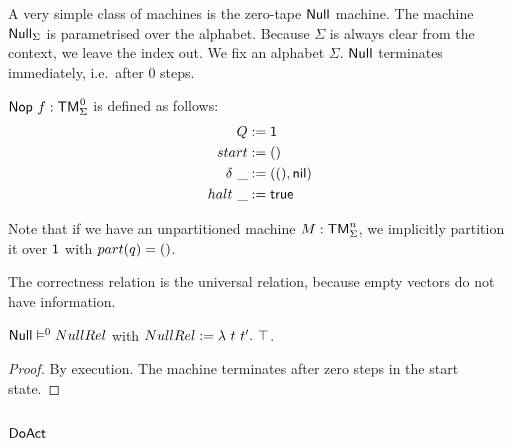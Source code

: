 A very simple class of machines is the zero-tape $\mathsf{Null}$ machine.  The machine $\mathsf{Null}_\Sigma$ is parametrised over the alphabet.  Because
$\Sigma$ is always clear from the context, we leave the index out.  We fix an alphabet $\Sigma$.  $\mathsf{Null}$ terminates immediately, i.e.\ after $0$
steps.

\begin{definition}[Null][Null]
  \label{def:Null}
  $\MS{Nop}~f: \TM_\Sigma^{\mkern+1mu 0}$ is defined as follows:
  \begin{align*}
    Q          &:= \mathsf{1} \\
    start      &:= \mathsf{()} \\
    \delta ~\_ &:= (\mathsf{()}, \mathsf{nil}) \\
    halt   ~\_ &:= \mathsf{true}
  \end{align*}
\end{definition}
Note that if we have an unpartitioned machine $M:\mathsf{TM}_\Sigma^n$, we implicitly partition it over $\mathsf{1}$ with $part(q)=\mathsf{()}$.

The correctness relation is the universal relation, because empty vectors do not have information.
\begin{lemma}
  \label{lem:Null_Sem} $\mathsf{Null} \mathrel{\vDash^{0}} NullRel$ with $NullRel := \lambda~t~t'.~ \top$.
\end{lemma}
\begin{proof}
  By execution.  The machine terminates after zero steps in the start state.
\end{proof}

\subsection{$\mathsf{DoAct}$}
\label{sec:DoAct}



